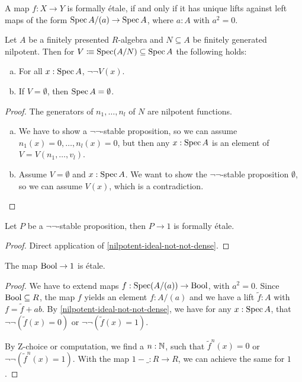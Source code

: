 \begin{lemma}%
  A map $f:X\to Y$ is formally étale,
  if and only if it has unique lifts against left maps of the form $\operatorname{Spec} A/(a)\to \operatorname{Spec} A$,
  where $a:A$ with $a^2=0$.
\end{lemma}

\begin{lemma}%
  \label{nilpotent-ideal-not-not-dense}
  Let $A$ be a finitely presented $R$-algebra and $N\subseteq A$ be finitely generated nilpotent.
  Then for $V\vcentcolon\mspace{-1.2mu}\equiv \operatorname{Spec} (A/N)\subseteq \operatorname{Spec} A$ the following holds:
  \begin{enumerate}[(a)]
  \item For all $x:\operatorname{Spec} A$, $\neg\neg V(x)$.
  \item If $V=\emptyset$, then $\operatorname{Spec} A=\emptyset$.
  \end{enumerate}
\end{lemma}

\begin{proof}
  The generators of $n_1,\dots,n_l$ of $N$ are nilpotent functions.
  \begin{enumerate}[(a)]
  \item We have to show a $\neg\neg$-stable proposition,
    so we can assume $n_1(x)=0,\dots,n_l(x)=0$, but then any $x:\operatorname{Spec} A$ is an element of $V=V(n_1,\dots,v_l)$.
  \item Assume $V=\emptyset$ and $x:\operatorname{Spec} A$.
        We want to show the $\neg\neg$-stable proposition $\emptyset$,
        so we can assume $V(x)$, which is a contradiction.
  \end{enumerate}
\end{proof}

\begin{proposition}%
  Let $P$ be a $\neg\neg$-stable proposition,
  then $P\to 1$ is formally étale.
\end{proposition}

\begin{proof}
  Direct application of \cref{nilpotent-ideal-not-not-dense}.
\end{proof}

\begin{proposition}%
  The map $\mathrm{Bool}\to 1$ is étale.
\end{proposition}

\begin{proof}
  We have to extend maps $f:\operatorname{Spec} (A/(a))\to \mathrm{Bool}$, with $a^2=0$.
  Since $\mathrm{Bool}\subseteq R$, the map $f$ yields an element $f:A/(a)$
  and we have a lift $\tilde{f}:A$ with $f=\tilde{f}+ab$.
  By \cref{nilpotent-ideal-not-not-dense},
  we have for any $x:\operatorname{Spec} A$, that $\neg\neg(\tilde{f}(x)=0)$ or $\neg\neg(\tilde{f}(x)=1)$.

  By Z-choice or computation, we find a $n:\mathbb{N}$,
  such that $\tilde{f}^n(x)=0$ or $\neg\neg(\tilde{f}^n(x)=1)$.
  With the map $1-\_:R\to R$, we can achieve the same for $1$.
\end{proof}

